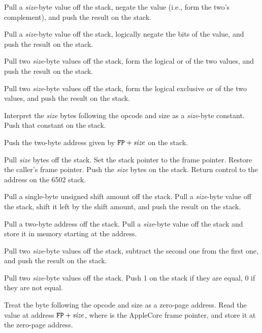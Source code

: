 \documentclass[10pt]{article}
\begin{document}
 Pull a \emph{size}-byte
value off the stack, negate the value (i.e., form the two's
complement), and push the result on the stack.

 Pull a \emph{size}-byte value
off the stack, logically negate the bits of the value, and push the
result on the stack.

 Pull two
\emph{size}-byte values off the stack, form the logical or of the two
values, and push the result on the stack.

 Pull two
\emph{size}-byte values off the stack, form the logical exclusive or
of the two values, and push the result on the stack.

Interpret the \emph{size} bytes following the opcode and size
as a \emph{size}-byte constant.  Push that constant on the
stack.

Push the two-byte address given by $\texttt{FP}+\mbox{\textit{size}}$ on
the stack.

Pull \emph{size} bytes off the stack.  Set the stack pointer to the
frame pointer.  Restore the caller's frame pointer.  Push the
\emph{size} bytes on the stack.  Return control to the address on the
6502 stack.

 Pull a single-byte
unsigned
shift amount off the stack.  Pull a \emph{size}-byte value off the
stack, shift it left by the shift amount, and push the result on the
stack.

Pull a two-byte address off the stack.  Pull a \emph{size}-byte
value off the stack and store it in memory starting at the
address.

Pull two \emph{size}-byte values off the stack, subtract the
second one from the first one, and push the result on the stack.

Pull two \emph{size}-byte values off the stack. Push 1 on the stack
if they are equal, 0 if they are not equal.

Treat the byte following the opcode and size as a zero-page
address.  Read the value at address $\texttt{FP}+\mbox{\textit{size}}$, 
where  is the AppleCore frame pointer, and store
it at the zero-page address.
\end{document}
